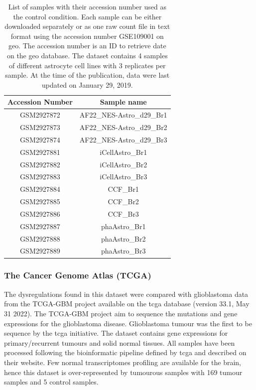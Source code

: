 \begin{table}
    \centering
    \begin{tabular}{ |c|c| }
        \hline
        Accession Number & Sample name \\
        \hline
        GSM2927872 & AF22\_NES-Astro\_d29\_Br1 \\
        GSM2927873 & AF22\_NES-Astro\_d29\_Br2 \\
        GSM2927874 & AF22\_NES-Astro\_d29\_Br3 \\
        \hline
        GSM2927881 & iCellAstro\_Br1 \\
        GSM2927882 & iCellAstro\_Br2 \\
        GSM2927883 & iCellAstro\_Br3 \\
        \hline
        GSM2927884 & CCF\_Br1 \\
        GSM2927885 & CCF\_Br2 \\
        GSM2927886 & CCF\_Br3 \\
        \hline
        GSM2927887 & phaAstro\_Br1 \\ 
        GSM2927888 & phaAstro\_Br2 \\ 
        GSM2927889 & phaAstro\_Br3 \\ 
        \hline
    \end{tabular}
    \caption{
        List of samples with their accession number used as the control condition.
        Each sample can be either downloaded separately or as one raw count file in text format using the accession number GSE109001 on \acrfull{geo}.
        The accession number is an ID to retrieve date on the \acrshort{geo} database.
        The dataset contains 4 samples of different astrocyte cell lines with 3 replicates per sample.
        At the time of the publication, data were last updated on January 29, 2019.
    }
    \label{table:list-control-samples}
\end{table}

\subsubsection{The Cancer Genome Atlas (TCGA) }

The dysregulations found in this dataset were compared with glioblastoma data from the TCGA-GBM project available on the \acrshort{tcga} database (version 33.1, May 31 2022).
The TCGA-GBM project aim to sequence the mutations and gene expressions for the glioblastoma disease.
Glioblastoma tumour was the first to be sequence by the \acrshort{tcga} initiative.
The dataset contains gene expressions for primary/recurrent tumours and solid normal tissues.
All samples have been processed following the bioinformatic pipeline defined by \acrshort{tcga} and described on their website.
Few normal transcriptomes profiling are available for the brain, hence this dataset is over-represented by tumourous samples with 169 tumour samples and 5 control samples.

